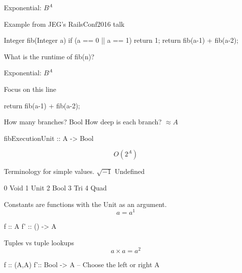 \documentclass{beamer}
\begin{document}
\begin{frame}[fragile]
Exponential: $B^{A} $\newline\newline

Example from JEG's RailsConf2016 talk
\begin{ccode}
Integer fib(Integer a){
    if (a == 0 || a == 1) 
        return 1;
   return fib(a-1) + fib(a-2);
}
\end{ccode}

What is the runtime of fib(n)?
\end{frame}


\begin{frame}[fragile]
Exponential: $ B^{A} $\newline\newline

Focus on this line
\begin{ccode}
      return fib(a-1) + fib(a-2);
\end{ccode}

How many branches? Bool\newline
How deep is each branch? $\approx A$ 
\begin{code}
fibExecutionUnit :: A -> Bool
\end{code}
         $$O(2^{A})$$
\end{frame}





\begin{frame}[fragile]
Terminology for simple values.\newline\newline
$\sqrt{-1}$ Undefined 
\begin{ccode}
0 Void
1 Unit
2 Bool 
3 Tri
4 Quad
\end{ccode}
\end{frame}



\begin{frame}[fragile]
Constants are functions with the Unit as an argument.
$$a = a^{1} $$
\begin{code}
f ::  A
f' :: () -> A
\end{code}
\end{frame}


\begin{frame}[fragile]
Tuples vs tuple lookups\\
$$a \times a = a^2$$


\begin{code}
f :: (A,A)
f':: Bool -> A  -- Choose the left or right A
\end{code}

\end{frame}
\end{document}
